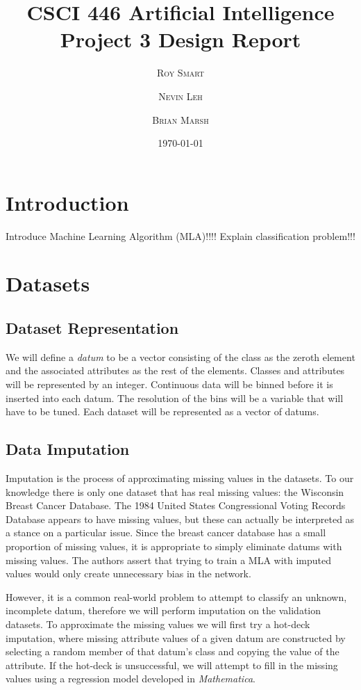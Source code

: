\documentclass{article}
\title{\vspace{-15mm}\fontsize{24pt}{10pt}\selectfont\textbf{CSCI 446 Artificial Intelligence \\[2mm] Project 3 Design Report} } %
\date{\today}
\author{
\large
\textsc{Roy Smart} \and \textsc{Nevin Leh} \and \textsc{Brian Marsh}\\[2mm] %
}
\begin{document}
	\maketitle %
	\thispagestyle{fancy} %
	\normalsize

	\section{Introduction}
	Introduce Machine Learning Algorithm (MLA)!!!!
	Explain classification problem!!!
	\section{Datasets}
		\subsection{Dataset Representation}
			We will define a \textit{datum} to be a vector consisting of the class as the zeroth element and the associated attributes as the rest of the elements. Classes and attributes will be represented by an integer. Continuous data will be binned before it is inserted into each datum. The resolution of the bins will be a variable that will have to be tuned. Each dataset will be represented as a vector of datums.
		\subsection{Data Imputation}
			Imputation is the process of approximating missing values in the datasets. 
			To our knowledge there is only one dataset that has real missing values: the Wisconsin Breast Cancer Database. 
			The 1984 United States Congressional Voting Records Database appears to have missing values, but these can actually be interpreted as a stance on a particular issue. 
			Since the breast cancer database has a small proportion of missing values, it is appropriate to simply eliminate datums with missing values. 
			The authors assert that trying to train a MLA with imputed values would only create unnecessary bias in the network.
			
			However, it is a common real-world problem to attempt to classify an unknown, incomplete datum, therefore we will perform imputation on the validation datasets. 
			To approximate the missing values we will first try a hot-deck imputation, where missing attribute values of a given datum are constructed by selecting a random member of that datum's class and copying the value of the attribute. 
			If the hot-deck is unsuccessful, we will attempt to fill in the missing values using a regression model developed in \textit{Mathematica}.
\end{document}
